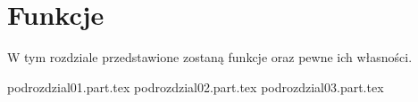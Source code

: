 \chapter{Funkcje}
W tym rozdziale przedstawione zostaną funkcje oraz pewne ich własności.

{podrozdzial01.part.tex}
{podrozdzial02.part.tex}
{podrozdzial03.part.tex}

